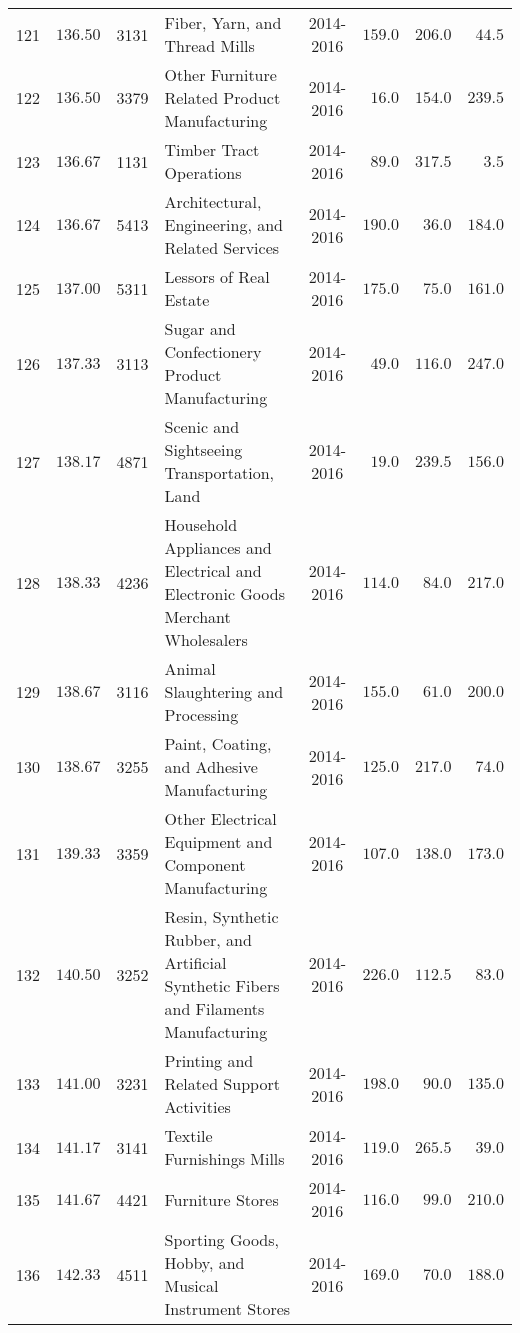 \documentclass[9pt, oneside]{article}   	%
\begin{document}
\begin{longtable}{cccp{2.0in}cccc}
121  & $136.50$ & 3131 & Fiber, Yarn, and Thread Mills & 2014-2016 & $159.0$ & $206.0$ & $\phantom{0}44.5$ \\
122  & $136.50$ & 3379 & Other Furniture Related Product Manufacturing & 2014-2016 & $\phantom{0}16.0$ & $154.0$ & $239.5$ \\
123  & $136.67$ & 1131 & Timber Tract Operations & 2014-2016 & $\phantom{0}89.0$ & $317.5$ & $\phantom{00}3.5$ \\
124  & $136.67$ & 5413 & Architectural, Engineering, and Related Services & 2014-2016 & $190.0$ & $\phantom{0}36.0$ & $184.0$ \\
125  & $137.00$ & 5311 & Lessors of Real Estate & 2014-2016 & $175.0$ & $\phantom{0}75.0$ & $161.0$ \\
126  & $137.33$ & 3113 & Sugar and Confectionery Product Manufacturing & 2014-2016 & $\phantom{0}49.0$ & $116.0$ & $247.0$ \\
127  & $138.17$ & 4871 & Scenic and Sightseeing Transportation, Land & 2014-2016 & $\phantom{0}19.0$ & $239.5$ & $156.0$ \\
128  & $138.33$ & 4236 & Household Appliances and Electrical and Electronic Goods Merchant Wholesalers & 2014-2016 & $114.0$ & $\phantom{0}84.0$ & $217.0$ \\
129  & $138.67$ & 3116 & Animal Slaughtering and Processing & 2014-2016 & $155.0$ & $\phantom{0}61.0$ & $200.0$ \\
130  & $138.67$ & 3255 & Paint, Coating, and Adhesive Manufacturing & 2014-2016 & $125.0$ & $217.0$ & $\phantom{0}74.0$ \\
131  & $139.33$ & 3359 & Other Electrical Equipment and Component Manufacturing & 2014-2016 & $107.0$ & $138.0$ & $173.0$ \\
132  & $140.50$ & 3252 & Resin, Synthetic Rubber, and Artificial Synthetic Fibers and Filaments Manufacturing & 2014-2016 & $226.0$ & $112.5$ & $\phantom{0}83.0$ \\
133  & $141.00$ & 3231 & Printing and Related Support Activities & 2014-2016 & $198.0$ & $\phantom{0}90.0$ & $135.0$ \\
134  & $141.17$ & 3141 & Textile Furnishings Mills & 2014-2016 & $119.0$ & $265.5$ & $\phantom{0}39.0$ \\
135  & $141.67$ & 4421 & Furniture Stores & 2014-2016 & $116.0$ & $\phantom{0}99.0$ & $210.0$ \\
136  & $142.33$ & 4511 & Sporting Goods, Hobby, and Musical Instrument Stores & 2014-2016 & $169.0$ & $\phantom{0}70.0$ & $188.0$ \\

\end{longtable}
\end{document}
